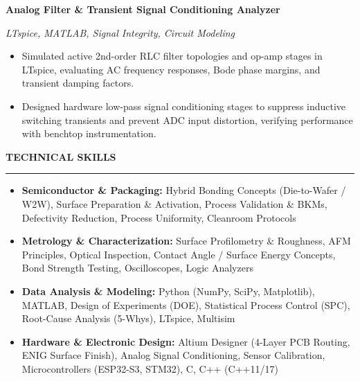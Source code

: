 \documentclass[10pt]{article}
\newcommand{\Section}[1]{%
  \vspace{2.5pt}%
  \textbf{\MakeUppercase{#1}}\par\vspace{-3.5pt}%
  \rule{\linewidth}{0.5pt}\par\vspace{1.2pt}%
}
\newcommand{\Company}[2]{\noindent\textbf{#1}\hfill\textbf{#2}\par}
\newcommand{\RoleDates}[2]{\noindent\textit{#1}\hfill\textit{#2}\par}
\begin{document}
\Company{Analog Filter \& Transient Signal Conditioning Analyzer}{}
\RoleDates{LTspice, MATLAB, Signal Integrity, Circuit Modeling}{}
\begin{itemize}
  \item Simulated active 2nd-order RLC filter topologies and op-amp stages in LTspice, evaluating AC frequency responses, Bode phase margins, and transient damping factors.
  \item Designed hardware low-pass signal conditioning stages to suppress inductive switching transients and prevent ADC input distortion, verifying performance with benchtop instrumentation.
\end{itemize}

\Section{Technical Skills}
\begin{itemize}[leftmargin=0.15in, label={}, itemsep=0.8pt, topsep=0.5pt]
  \item \textbf{Semiconductor \& Packaging:} Hybrid Bonding Concepts (Die-to-Wafer / W2W), Surface Preparation \& Activation, Process Validation \& BKMs, Defectivity Reduction, Process Uniformity, Cleanroom Protocols
  \item \textbf{Metrology \& Characterization:} Surface Profilometry \& Roughness, AFM Principles, Optical Inspection, Contact Angle / Surface Energy Concepts, Bond Strength Testing, Oscilloscopes, Logic Analyzers
  \item \textbf{Data Analysis \& Modeling:} Python (NumPy, SciPy, Matplotlib), MATLAB, Design of Experiments (DOE), Statistical Process Control (SPC), Root-Cause Analysis (5-Whys), LTspice, Multisim
  \item \textbf{Hardware \& Electronic Design:} Altium Designer (4-Layer PCB Routing, ENIG Surface Finish), Analog Signal Conditioning, Sensor Calibration, Microcontrollers (ESP32-S3, STM32), C, C++ (C++11/17)
\end{itemize}
\end{document}
